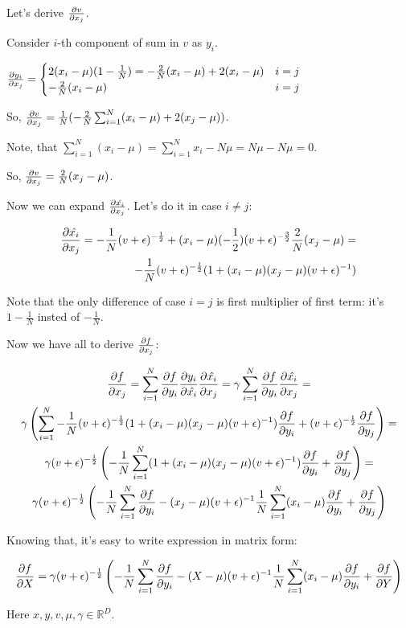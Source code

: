 \documentclass[12pt]{article}
\begin{document}
Let's derive $\pdv{v}{x_j}$.

Consider $i$-th component of sum in $v$ as $y_i$.

$
\pdv{y_i}{x_j} = 
\begin{cases}
2 (x_i - \mu) (1 - \frac{1}{N}) = -\frac{2}{N} (x_i - \mu) + 2(x_i - \mu) & \text{$i = j$} \\
-\frac{2}{N} (x_i - \mu) & \text{$i = j$}
\end{cases}
$ 

So, $\pdv{v}{x_j} = \frac{1}{N} ( -\frac{2}{N} \sum_{i=1}^{N}(x_i - \mu) + 2(x_j - \mu))$.

Note, that $\sum_{i=1}^{N}(x_i - \mu) = \sum_{i=1}^{N} x_i - N \mu = N \mu - N \mu = 0$.

So, $\pdv{v}{x_j} = \frac{2}{N} (x_j - \mu)$.

Now we can expand $\pdv{\hat{x_i}}{x_j}$. Let's do it in case $i \ne j$:

\begin{gather*}
\begin{split}
\pdv{\hat{x_i}}{x_j} =
-\frac{1}{N} (v + \epsilon)^{-\frac{1}{2}} + (x_i - \mu) (-\frac{1}{2}) (v + \epsilon)^{-\frac{3}{2}} \frac{2}{N}(x_j - \mu) = \\
-\frac{1}{N} (v + \epsilon)^{-\frac{1}{2}} (1 + (x_i - \mu) (x_j - \mu) (v + \epsilon)^{-1})
\end{split}
\end{gather*}

Note that the only difference of case $i = j$ is first multiplier of first term: it's $1 - \frac{1}{N}$ insted of $-\frac{1}{N}$.

Now we have all to derive $\pdv{f}{x_j}$:

\begin{gather*}
\pdv{f}{x_j} = 
\sum_{i=1}^{N} \pdv{f}{y_i} \pdv{y_i}{\hat{x_i}} \pdv{\hat{x_i}}{x_j} = 
\gamma \sum_{i=1}^{N} \pdv{f}{y_i} \pdv{\hat{x_i}}{x_j} = \\
\gamma \left( \sum_{i=1}^{N} -\frac{1}{N} (v + \epsilon)^{-\frac{1}{2}} (1 + (x_i - \mu) (x_j - \mu) (v + \epsilon)^{-1}) \pdv{f}{y_i} + (v + \epsilon)^{-\frac{1}{2}} \pdv{f}{y_j} \right) = \\
\gamma (v + \epsilon)^{-\frac{1}{2}} \left( -\frac{1}{N} \sum_{i=1}^{N} (1 + (x_i - \mu) (x_j - \mu) (v + \epsilon)^{-1}) \pdv{f}{y_i} + \pdv{f}{y_j} \right) = \\
\gamma (v + \epsilon)^{-\frac{1}{2}} \left( -\frac{1}{N} \sum_{i=1}^{N} \pdv{f}{y_i} - (x_j - \mu) (v + \epsilon)^{-1} \frac{1}{N} \sum_{i=1}^{N} (x_i - \mu) \pdv{f}{y_i} + \pdv{f}{y_j} \right)
\end{gather*}

\newpage

Knowing that, it's easy to write expression in matrix form:

\[
	\pdv{f}{X} = \gamma (v + \epsilon)^{-\frac{1}{2}} \left( -\frac{1}{N} \sum_{i=1}^{N} \pdv{f}{y_i} - (X - \mu) (v + \epsilon)^{-1} \frac{1}{N} \sum_{i=1}^{N} (x_i - \mu) \pdv{f}{y_i} + \pdv{f}{Y} \right) 
\]

Here $x, y, v, \mu, \gamma \in \mathbb{R}^D$.
\end{document}
